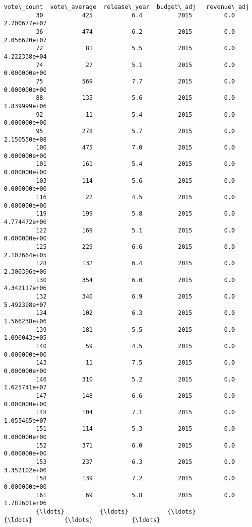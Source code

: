 \documentclass[11pt]{article}
\begin{document}
\begin{Verbatim}[commandchars=\\\{\}]
               vote\_count  vote\_average  release\_year  budget\_adj   revenue\_adj  
         30           425           6.4          2015         0.0  2.700677e+07  
         36           474           6.2          2015         0.0  2.056620e+07  
         72            81           5.5          2015         0.0  4.222338e+04  
         74            27           5.1          2015         0.0  0.000000e+00  
         75           569           7.7          2015         0.0  0.000000e+00  
         88           135           5.6          2015         0.0  1.839999e+06  
         92            11           5.4          2015         0.0  0.000000e+00  
         95           278           5.7          2015         0.0  2.150550e+08  
         100          475           7.0          2015         0.0  0.000000e+00  
         101          161           5.4          2015         0.0  0.000000e+00  
         103          114           5.6          2015         0.0  0.000000e+00  
         116           22           4.5          2015         0.0  0.000000e+00  
         119          199           5.8          2015         0.0  4.774472e+06  
         122          169           5.1          2015         0.0  0.000000e+00  
         125          229           6.6          2015         0.0  2.107664e+05  
         128          132           6.4          2015         0.0  2.300396e+06  
         130          354           6.0          2015         0.0  4.342117e+06  
         132          340           6.9          2015         0.0  5.492398e+07  
         134          102           6.3          2015         0.0  1.566238e+06  
         139          181           5.5          2015         0.0  1.090043e+05  
         140           59           4.5          2015         0.0  0.000000e+00  
         143           11           7.5          2015         0.0  0.000000e+00  
         146          310           5.2          2015         0.0  1.625741e+07  
         147          148           6.6          2015         0.0  0.000000e+00  
         148          104           7.1          2015         0.0  1.055465e+07  
         151          114           5.3          2015         0.0  0.000000e+00  
         152          371           6.0          2015         0.0  0.000000e+00  
         153          237           6.3          2015         0.0  3.352102e+06  
         158          139           7.2          2015         0.0  0.000000e+00  
         161           69           5.8          2015         0.0  1.781601e+06  
         {\ldots}          {\ldots}           {\ldots}           {\ldots}         {\ldots}           {\ldots}  

\end{Verbatim}
\end{document}
